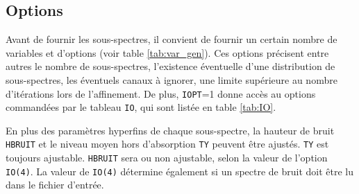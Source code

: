 \subsection{Options}
\label{part:options}
Avant de fournir les sous-spectres, il convient de fournir un certain nombre de variables et d'options (voir table \ref{tab:var_gen}).
Ces options précisent entre autres le nombre de sous-spectres, l'existence éventuelle d'une distribution de sous-spectres, les éventuels canaux à ignorer, une limite supérieure au nombre d'itérations lors de l'affinement.
De plus, \lstinline{IOPT}=1 donne accès au options commandées par le tableau \lstinline{IO}, qui sont listée en table \ref{tab:IO}. 

En plus des paramètres hyperfins de chaque sous-spectre, la hauteur de bruit \lstinline{HBRUIT} et le niveau moyen hors d'absorption \lstinline{TY} peuvent être ajustés.
\lstinline{TY} est toujours ajustable. 
\lstinline{HBRUIT} sera ou non  ajustable, selon la valeur de l'option \lstinline{IO(4)}.
La valeur de \lstinline{IO(4)} détermine également si un spectre de bruit doit être lu dans le fichier d'entrée.

